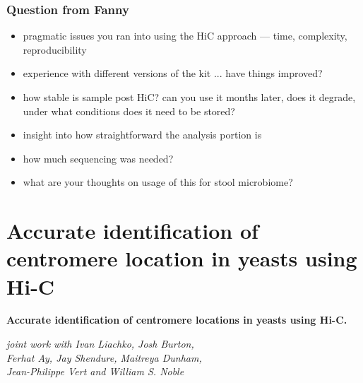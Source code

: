 \documentclass[xcolor=dvipsnames]{beamer}
\begin{document}
\begin{frame}
\frametitle{Question from Fanny}
\begin{itemize}
\item pragmatic issues you ran into using the HiC approach --- time, complexity,
reproducibility
\item experience with different versions of the kit ... have things improved?
\item how stable is sample post HiC? can you use it months later, does it degrade,
under what conditions does it need to be stored?
\item insight into how straightforward the analysis portion is
\item how much sequencing was needed?
\item what are your thoughts on usage of this for stool microbiome?
\end{itemize}
\end{frame}

\section{Accurate identification of centromere location in yeasts using Hi-C}
\begin{frame}
\Large{ \bf
Accurate identification of centromere locations in yeasts using Hi-C.}

\begin{flushright}
\vspace{1em}
\small

\textit{joint work with  Ivan Liachko, Josh Burton, \\
Ferhat Ay, Jay Shendure, Maitreya Dunham, \\ Jean-Philippe Vert and William S.
Noble 
}
\end{flushright}

\end{frame}
\end{document}
